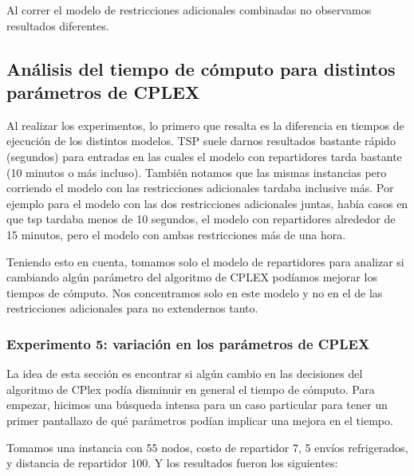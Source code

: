 \documentclass{article}
\begin{document}
    Al correr el modelo de restricciones adicionales combinadas no observamos resultados diferentes.

    \subsection{Análisis del tiempo de cómputo para distintos parámetros de CPLEX}

    Al realizar los experimentos, lo primero que resalta es la diferencia en tiempos de ejecución de los distintos modelos. TSP suele darnos resultados bastante rápido (segundos) para entradas en las cuales el modelo con repartidores tarda bastante (10 minutos o más incluso). También notamos que las mismas instancias pero corriendo el modelo con las restricciones adicionales tardaba inclusive más. Por ejemplo para el modelo con las dos restricciones adicionales juntas, había casos en que tsp tardaba menos de 10 segundos, el modelo con repartidores alrededor de 15 minutos, pero el modelo con ambas restricciones más de una hora.

    Teniendo esto en cuenta, tomamos solo el modelo de repartidores para analizar si cambiando algún parámetro del algoritmo de CPLEX podíamos mejorar los tiempos de cómputo. Nos concentramos solo en este modelo y no en el de las restricciones adicionales para no extendernos tanto.


    \subsubsection{Experimento 5: variación en los parámetros de CPLEX}
    La idea de esta sección es encontrar si algún cambio en las decisiones del algoritmo de CPlex podía disminuir en general el tiempo de cómputo. Para empezar, hicimos una búsqueda intensa para un caso particular para tener un primer pantallazo de qué parámetros podían implicar una mejora en el tiempo.

    Tomamos una instancia con 55 nodos, costo de repartidor 7, 5 envíos refrigerados, y distancia de repartidor 100. Y los resultados fueron los siguientes:
\end{document}
